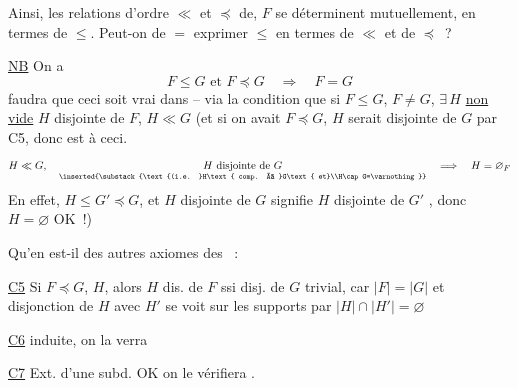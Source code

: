 Ainsi, les relations d'ordre $\ll$ et $\preceq$ de, $F$ se déterminent mutuellement, en termes de $\leq$. Peut-on de $=$ exprimer $\leq$ en termes de $\ll$ et de $\preceq$~?

\uline{NB} On a
\[
 F\leq G\text{ et }F\preceq G\quad\Longrightarrow\quad F=G
\]
 faudra que ceci soit vrai dans   -- via la condition que si $F\leq G$, $F\ne G$, $\exists\,H$  \uline{non vide} $H$ disjointe de $F$, $H\ll G$ (et si on avait $F\preceq G$, $H$ serait disjointe de $G$ par C5, donc  est  à ceci. 
\[
 H\ll G,\quad
 \underset{\inserted{\substack{\text{(i.e. }H\text{ comp. à }G\text{ et}\\H\cap G=\varnothing}}}{H\text{ disjointe de }G}
 \quad\Longrightarrow\quad H=\varnothing_{F}
\]
En effet, $H\leq G'\preceq G$,  et $H$ disjointe de $G$ signifie $H$ disjointe de $G'$ , donc $H=\varnothing$ OK~!)


Qu'en est-il des autres axiomes des ~:

\uline{C5} Si $F\preceq G$, $H$, alors $H$ dis. de $F$ ssi disj. de $G$ trivial, car $|F|=|G|$ et disjonction de $H$ avec $H'$ se voit sur les supports par $|H|\cap|H'|=\varnothing$

\uline{C6}  induite, on la verra 

\uline{C7} Ext. d'une subd. OK on le vérifiera .

